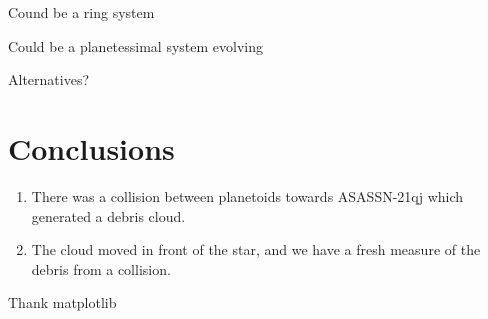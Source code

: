 \documentclass{aa}
\begin{document}
Cound be a ring system

Could be a planetessimal system evolving

Alternatives?

\section{Conclusions}\label{sec:conclusion}

   \begin{enumerate}
      \item There was a collision between planetoids towards ASASSN-21qj which generated a debris cloud.
      \item The cloud moved in front of the star, and we have a fresh measure of the debris from a collision.
   \end{enumerate}

\begin{acknowledgements}
Thank matplotlib

\end{acknowledgements}



\end{document}
